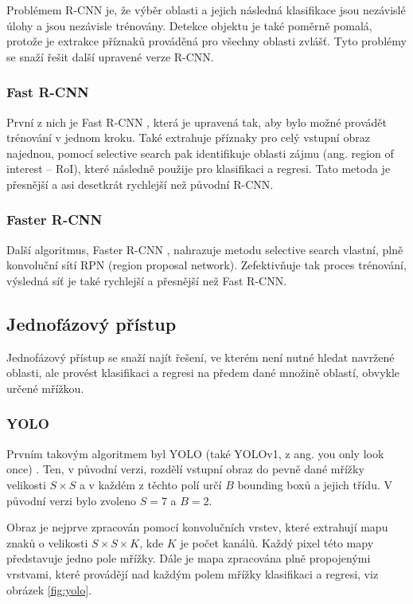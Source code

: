 Problémem R-CNN je, že výběr oblasti a jejich následná klasifikace jsou
nezávislé úlohy a jsou nezávisle trénovány. Detekce objektu je také poměrně
pomalá, protože je extrakce příznaků prováděná pro všechny oblasti zvlášť. Tyto
problémy se snaží řešit další upravené verze R-CNN.

\subsubsection*{Fast R-CNN}
První z nich je Fast R-CNN \cite{fast-r-cnn}, která je upravená tak, aby bylo
možné provádět trénování v jednom kroku. Také extrahuje příznaky pro celý
vstupní obraz najednou, pomocí selective search pak identifikuje oblasti zájmu
(ang. region of interest – RoI), které následně použije pro klasifikaci a
regresi. Tato metoda je přesnější a asi desetkrát rychlejší než původní R-CNN.

\subsubsection*{Faster R-CNN}
Další algoritmus, Faster R-CNN \cite{faster-r-cnn}, nahrazuje metodu selective
search vlastní, plně konvoluční sítí RPN (region proposal network).
Zefektivňuje tak proces trénování, výsledná síť je také rychlejší a přesnější
než Fast R-CNN.

\subsection{Jednofázový přístup}

Jednofázový přístup se snaží najít řešení, ve kterém není nutné hledat navržené
oblasti, ale provést klasifikaci a regresi na předem dané množině oblastí,
obvykle určené mřížkou.

\subsubsection*{YOLO}
Prvním takovým algoritmem byl YOLO (také YOLOv1, z ang. you only look once)
\cite{yolo}. Ten, v původní verzi, rozdělí vstupní obraz do pevně dané mřížky
velikosti $S \times S$ a v každém z těchto polí určí $B$ bounding boxů a jejich
třídu. V původní verzi bylo zvoleno $S = 7$ a $B = 2$.

Obraz je nejprve zpracován pomocí konvolučních vrstev, které extrahují mapu
znaků o velikosti $S \times S \times K$, kde $K$ je počet kanálů. Každý pixel
této mapy představuje jedno pole mřížky. Dále je mapa zpracována plně
propojenými vrstvami, které provádějí nad každým polem mřížky klasifikaci a
regresi, viz obrázek \ref{fig:yolo}.

